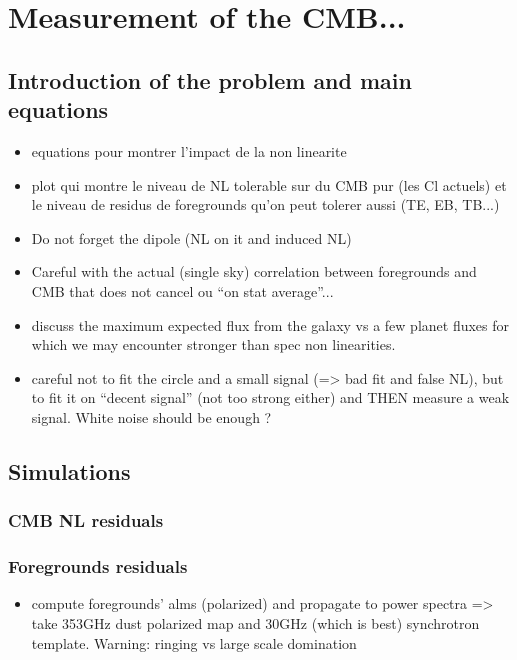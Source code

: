 
\section{Measurement of the CMB...}

\subsection{Introduction of the problem and main equations}
\begin{itemize}
\item equations pour montrer l'impact de la non linearite
\item plot qui montre le niveau de NL tolerable sur du CMB pur (les Cl actuels)
  et le niveau de residus de foregrounds qu'on peut tolerer aussi (TE, EB,
  TB...)
\item Do not forget the dipole (NL on it and induced NL)
\item Careful with the actual (single sky) correlation between foregrounds and
  CMB that does not cancel ou ``on stat average''...
\item discuss the maximum expected flux from the galaxy vs a few planet fluxes
  for which we may encounter stronger than spec non linearities.
\item careful not to fit the circle and a small signal (=> bad fit and false
  NL), but to fit it on ``decent signal'' (not too strong either) and THEN
  measure a weak signal. White noise should be enough ?
\end{itemize}

\subsection{Simulations}
\subsubsection{CMB NL residuals}

\subsubsection{Foregrounds residuals}

\begin{itemize}
\item compute foregrounds' alms (polarized) and propagate to power spectra =>
  take 353GHz dust polarized map and 30GHz (which is best) synchrotron
  template. Warning: ringing vs large scale domination
\end{itemize}
